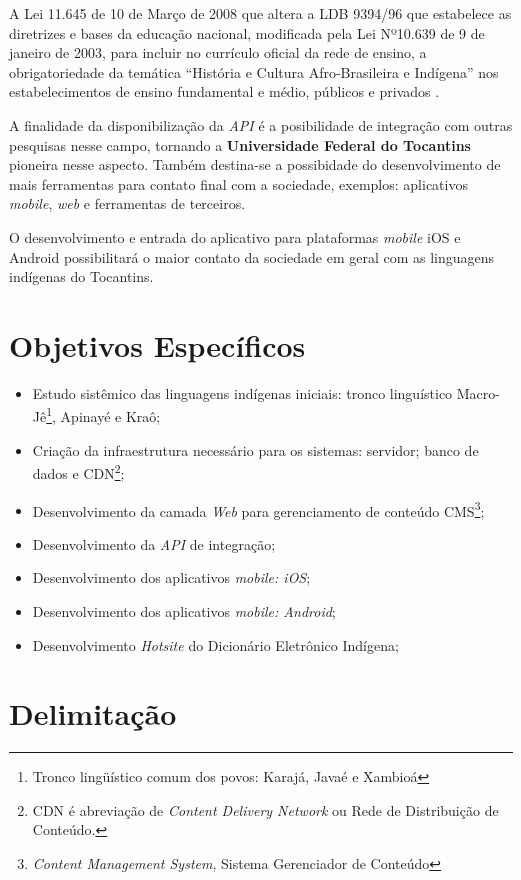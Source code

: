 \documentclass[journal]{IEEEtran}
\begin{document}
A Lei 11.645 de 10 de Março de 2008 que altera a LDB 9394/96 que estabelece as diretrizes e bases da educação nacional, modificada pela Lei Nº10.639 de 9 de janeiro de 2003, para incluir no currículo oficial da rede de ensino, a obrigatoriedade da temática “História e Cultura Afro-Brasileira e Indígena” nos estabelecimentos de ensino fundamental e médio, públicos e privados \cite{neppi2011}.

A finalidade da disponibilização da {\it API} é a posibilidade de integração com outras pesquisas nesse campo, tornando a {\bf Universidade Federal do Tocantins} pioneira nesse aspecto. Também destina-se a possibidade do desenvolvimento de mais ferramentas para contato final com a sociedade, exemplos: aplicativos {\it mobile}, {\it web} e ferramentas de terceiros.

O desenvolvimento e entrada do aplicativo para plataformas {\it mobile} iOS e Android possibilitará o maior contato da sociedade em geral com as linguagens indígenas do Tocantins. 

\section{Objetivos Específicos}

\begin{itemize}
    \item Estudo sistêmico das linguagens indígenas iniciais: tronco linguístico Macro-Jê\footnote{Tronco lingüístico comum dos povos: Karajá, Javaé e Xambioá}, Apinayé e Kraô;
    \item Criação da infraestrutura necessário para os sistemas: servidor; banco de dados e CDN\footnote{CDN é abreviação de {\it Content Delivery Network} ou Rede de Distribuição de Conteúdo. };
    \item Desenvolvimento da camada {\it Web} para gerenciamento de conteúdo CMS\footnote{{\it Content Management System}, Sistema Gerenciador de Conteúdo};
    \item Desenvolvimento da {\it API} de integração;
    \item Desenvolvimento dos aplicativos {\it mobile: iOS};
    \item Desenvolvimento dos aplicativos {\it mobile: Android};
    \item Desenvolvimento {\it Hotsite} do Dicionário Eletrônico Indígena;
\end{itemize}

\section{Delimitação}
\end{document}
